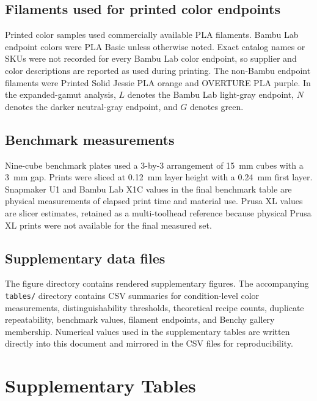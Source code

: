 \documentclass[preprint,12pt,authoryear]{elsarticle}
\begin{document}
\subsection*{Filaments used for printed color endpoints}

Printed color samples used commercially available PLA filaments. Bambu Lab endpoint colors were PLA Basic unless otherwise noted. Exact catalog names or SKUs were not recorded for every Bambu Lab color endpoint, so supplier and color descriptions are reported as used during printing. The non-Bambu endpoint filaments were Printed Solid Jessie PLA orange and OVERTURE PLA purple. In the expanded-gamut analysis, \(L\) denotes the Bambu Lab light-gray endpoint, \(N\) denotes the darker neutral-gray endpoint, and \(G\) denotes green.

\subsection*{Benchmark measurements}

Nine-cube benchmark plates used a 3-by-3 arrangement of 15~mm cubes with a 3~mm gap. Prints were sliced at 0.12~mm layer height with a 0.24~mm first layer. Snapmaker U1 and Bambu Lab X1C values in the final benchmark table are physical measurements of elapsed print time and material use. Prusa XL values are slicer estimates, retained as a multi-toolhead reference because physical Prusa XL prints were not available for the final measured set.

\subsection*{Supplementary data files}

The figure directory contains rendered supplementary figures. The accompanying \texttt{tables/} directory contains CSV summaries for condition-level color measurements, distinguishability thresholds, theoretical recipe counts, duplicate repeatability, benchmark values, filament endpoints, and Benchy gallery membership. Numerical values used in the supplementary tables are written directly into this document and mirrored in the CSV files for reproducibility.

\section*{Supplementary Tables}
\end{document}
